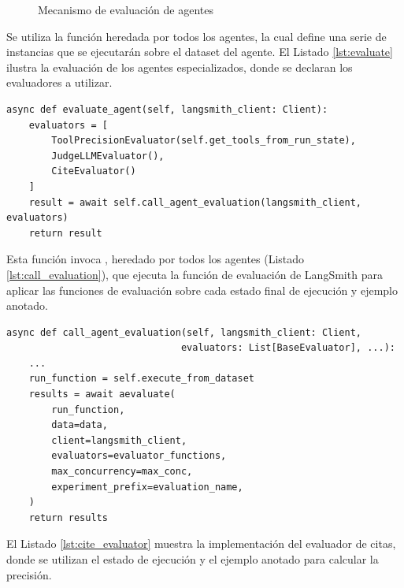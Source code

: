 \begin{figure}[h]
\centering
{}
\caption{Mecanismo de evaluación de agentes}
\label{fig:mem_1}
\end{figure}

Se utiliza la función  heredada por todos los agentes, la cual define una serie de instancias  que se ejecutarán sobre el dataset del agente. El Listado \ref{lst:evaluate} ilustra la evaluación de los agentes especializados, donde se declaran los evaluadores a utilizar.

\begin{lstlisting}[caption={Evaluación de agentes especializados},label={lst:evaluate}]
async def evaluate_agent(self, langsmith_client: Client):
    evaluators = [
        ToolPrecisionEvaluator(self.get_tools_from_run_state),
        JudgeLLMEvaluator(),
        CiteEvaluator()
    ]
    result = await self.call_agent_evaluation(langsmith_client, evaluators)
    return result
\end{lstlisting}

Esta función invoca , heredado por todos los agentes (Listado \ref{lst:call_evaluation}), que ejecuta la función de evaluación de LangSmith para aplicar las funciones de evaluación sobre cada estado final de ejecución y ejemplo anotado.

\begin{lstlisting}[caption={Llamada a evaluación de agentes},label={lst:call_evaluation}]
async def call_agent_evaluation(self, langsmith_client: Client, 
                               evaluators: List[BaseEvaluator], ...):
    ...
    run_function = self.execute_from_dataset
    results = await aevaluate(
        run_function,
        data=data,
        client=langsmith_client,
        evaluators=evaluator_functions,
        max_concurrency=max_conc,
        experiment_prefix=evaluation_name,
    )
    return results
\end{lstlisting}

El Listado \ref{lst:cite_evaluator} muestra la implementación del evaluador de citas, donde se utilizan el estado de ejecución y el ejemplo anotado para calcular la precisión.

